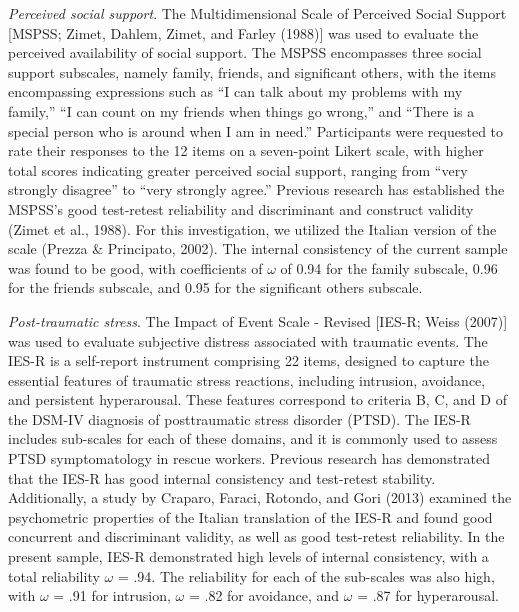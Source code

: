 \documentclass[
  man]{apa6}
\begin{document}
\emph{Perceived social support}. The Multidimensional Scale of Perceived Social Support {[}MSPSS; Zimet, Dahlem, Zimet, and Farley (1988){]} was used to evaluate the perceived availability of social support. The MSPSS encompasses three social support subscales, namely family, friends, and significant others, with the items encompassing expressions such as ``I can talk about my problems with my family,'' ``I can count on my friends when things go wrong,'' and ``There is a special person who is around when I am in need.'' Participants were requested to rate their responses to the 12 items on a seven-point Likert scale, with higher total scores indicating greater perceived social support, ranging from ``very strongly disagree'' to ``very strongly agree.'' Previous research has established the MSPSS's good test-retest reliability and discriminant and construct validity (Zimet et al., 1988). For this investigation, we utilized the Italian version of the scale (Prezza \& Principato, 2002). The internal consistency of the current sample was found to be good, with coefficients of \(\omega\) of 0.94 for the family subscale, 0.96 for the friends subscale, and 0.95 for the significant others subscale.

\emph{Post-traumatic stress}. The Impact of Event Scale - Revised {[}IES-R; Weiss (2007){]} was used to evaluate subjective distress associated with traumatic events. The IES-R is a self-report instrument comprising 22 items, designed to capture the essential features of traumatic stress reactions, including intrusion, avoidance, and persistent hyperarousal. These features correspond to criteria B, C, and D of the DSM-IV diagnosis of posttraumatic stress disorder (PTSD). The IES-R includes sub-scales for each of these domains, and it is commonly used to assess PTSD symptomatology in rescue workers. Previous research has demonstrated that the IES-R has good internal consistency and test-retest stability. Additionally, a study by Craparo, Faraci, Rotondo, and Gori (2013) examined the psychometric properties of the Italian translation of the IES-R and found good concurrent and discriminant validity, as well as good test-retest reliability.
In the present sample, IES-R demonstrated high levels of internal consistency, with a total reliability \(\omega\) = .94. The reliability for each of the sub-scales was also high, with \(\omega\) = .91 for intrusion, \(\omega\) = .82 for avoidance, and \(\omega\) = .87 for hyperarousal.
\end{document}
